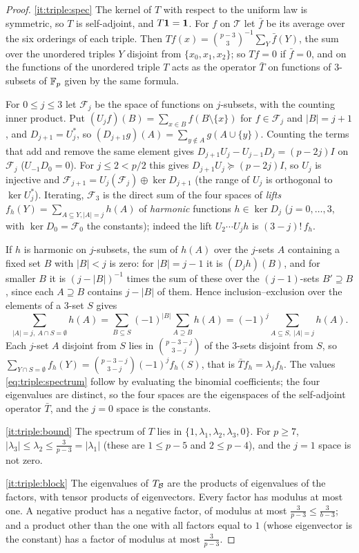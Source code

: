 \begin{proof}
\ref{it:triple:spec} The kernel of $T$ with respect to the uniform law is symmetric,
so $T$ is self-adjoint, and $T\mathbf 1=\mathbf 1$. For $f$ on $\mathcal T$ let $\bar f$ be its
average over the six orderings of each triple. Then
$Tf(x)=\binom{p-3}3^{-1}\sum_Y\bar f(Y)$, the sum over the unordered triples $Y$
disjoint from $\{x_0,x_1,x_2\}$; so $Tf=0$ if $\bar f=0$, and on the functions of
the unordered triple $T$ acts as the operator $\bar T$ on functions of
$3$-subsets of $\mathbb F_p$ given by the same formula.

For $0\le j\le3$ let $\mathcal F_j$ be the space of functions on $j$-subsets, with
the counting inner product. Put $(U_jf)(B)=\sum_{x\in B}f(B\setminus\{x\})$ for
$f\in\mathcal F_j$ and $|B|=j+1$, and $D_{j+1}=U_j^*$, so
$(D_{j+1}g)(A)=\sum_{y\notin A}g(A\cup\{y\})$. Counting the terms that add and
remove the same element gives $D_{j+1}U_j-U_{j-1}D_j=(p-2j)I$ on $\mathcal F_j$
($U_{-1}D_0=0$). For $j\le2<p/2$ this gives $D_{j+1}U_j\succeq(p-2j)I$, so $U_j$ is
injective and $\mathcal F_{j+1}=U_j(\mathcal F_j)\oplus\ker D_{j+1}$ (the range of
$U_j$ is orthogonal to $\ker U_j^*$). Iterating, $\mathcal F_3$ is the direct sum
of the four spaces of \emph{lifts} $f_h(Y)=\sum_{A\subseteq Y,|A|=j}h(A)$ of
\emph{harmonic} functions $h\in\ker D_j$ ($j=0,\dots,3$, with $\ker D_0=\mathcal F_0$
the constants); indeed the lift $U_2\cdots U_jh$ is $(3-j)!\,f_h$.

If $h$ is harmonic on $j$-subsets, the sum of $h(A)$ over the $j$-sets $A$
containing a fixed set $B$ with $|B|<j$ is zero: for $|B|=j-1$ it is $(D_jh)(B)$,
and for smaller $B$ it is $(j-|B|)^{-1}$ times the sum of these over the
$(j-1)$-sets $B'\supseteq B$, since each $A\supseteq B$ contains $j-|B|$ of them.
Hence inclusion--exclusion over the elements of a $3$-set $S$ gives
\[
 \sum_{|A|=j,\ A\cap S=\emptyset}h(A)=\sum_{B\subseteq S}(-1)^{|B|}\sum_{A\supseteq B}h(A)
 =(-1)^j\sum_{A\subseteq S,\ |A|=j}h(A) .
\]
Each $j$-set $A$ disjoint from $S$ lies in $\binom{p-3-j}{3-j}$ of the $3$-sets
disjoint from $S$, so
$\sum_{Y\cap S=\emptyset}f_h(Y)=\binom{p-3-j}{3-j}(-1)^jf_h(S)$, that is
$\bar Tf_h=\lambda_jf_h$. The values \eqref{eq:triple:spectrum} follow by
evaluating the binomial coefficients; the four eigenvalues are distinct, so the
four spaces are the eigenspaces of the self-adjoint operator $\bar T$, and the
$j=0$ space is the constants.

\ref{it:triple:bound} The spectrum of $T$ lies in $\{1,\lambda_1,\lambda_2,\lambda_3,0\}$. For
$p\ge7$, $|\lambda_3|\le\lambda_2\le\frac3{p-3}=|\lambda_1|$ (these are $1\le p-5$ and
$2\le p-4$), and the $j=1$ space is not zero.

\ref{it:triple:block} The eigenvalues of $T_{\mathcal B}$ are the products of eigenvalues of
the factors, with tensor products of eigenvectors. Every factor has modulus at
most one. A negative product has a negative factor, of modulus at most
$\frac3{p-3}\le\frac3{b-3}$; and a product other than the one with all factors
equal to $1$ (whose eigenvector is the constant) has a factor of modulus at most
$\frac3{p-3}$.
\end{proof}

